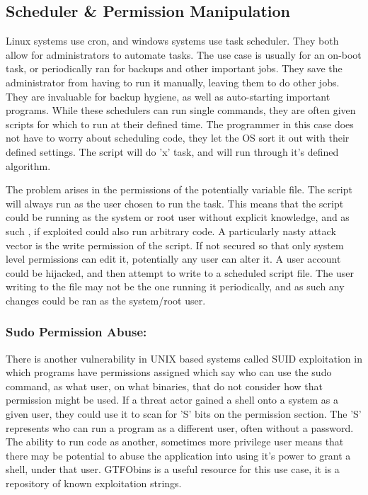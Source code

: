 
\subsection{Scheduler \& Permission Manipulation}
Linux systems use cron, and windows systems use task scheduler. They both allow for administrators to automate tasks. The use case is usually for an on-boot task, or periodically ran for backups and other important jobs.
They save the administrator from having to run it manually, leaving them to do other jobs. They are invaluable for backup hygiene, as well as auto-starting important programs. While these schedulers can run single commands, 
they are often given scripts for which to run at their defined time. The programmer in this case does not have to worry about scheduling code, they let the OS sort it out with their defined settings. The script will do 'x'
task, and will run through it's defined algorithm. 

The problem arises in the permissions of the potentially variable file. The script will always run as the user chosen to run the task. This means that the script could be running as the system or root user without explicit knowledge, and as such
, if exploited could also run arbitrary code. A particularly nasty attack vector is the write permission of the script. If not secured so that only system level permissions can edit it, potentially any user can alter it.
A user account could be hijacked, and then attempt to write to a scheduled script file. The user writing to the file may not be the one running it periodically, and as such any changes could be ran as the system/root user.

\subsubsection{Sudo Permission Abuse:}
There is another vulnerability in UNIX based systems called SUID exploitation in which programs have permissions assigned which say who can use the sudo command, as what user, on what binaries, that do not consider how that permission might be used. If a threat actor gained a shell onto a system as a given user, they could
use it to scan for 'S' bits on the permission section. The 'S' represents who can run a program as a different user, often without a password. The ability to run code as another, sometimes more privilege user means that there may be potential to abuse the application 
into using it's power to grant a shell, under that user. GTFObins is a useful resource for this use case, it is a repository of known exploitation strings. \citep{GTFOBins}

